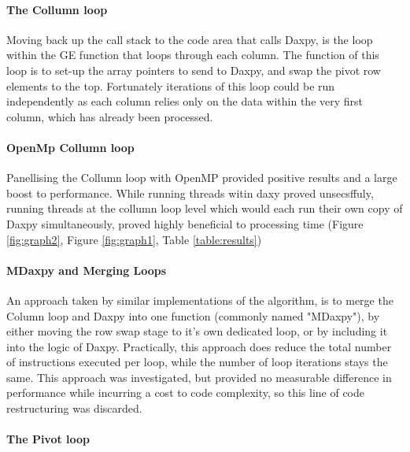 \documentclass[conference]{acmsiggraph}
\begin{document}
\paragraph{The Collumn loop}
Moving back up the call stack to the code area that calls Daxpy, is the loop within the GE function that loops through each column.
The function of this loop is to set-up the array pointers to send to Daxpy, and swap the pivot row elements to the top.
Fortunately iterations of this loop could be run independently as each column relies only on the data within the very first column, which has already been processed.

\paragraph{OpenMp Collumn loop}
Panellising the Collumn loop with OpenMP provided positive results and a large boost to performance. While running threads witin daxy proved unsecsffuly, running threads at the collumn loop level which would each run their own copy of Daxpy simultaneously, proved highly beneficial to processing time (Figure \ref{fig:graph2}, Figure \ref{fig:graph1}, Table \ref{table:results}) 

\paragraph{MDaxpy and Merging Loops}
An approach taken by similar implementations of the algorithm, is to merge the Column loop and Daxpy into one function (commonly named "MDaxpy"), by either moving the row swap stage to it's own dedicated loop, or by including it into the logic of Daxpy. Practically, this approach does reduce the total number of instructions executed per loop, while the number of loop iterations stays the same. This approach was investigated, but provided no measurable difference in performance while incurring a cost to code complexity, so this line of code restructuring was discarded.

\paragraph{The Pivot loop}
\end{document}
